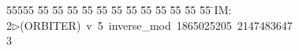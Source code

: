 %
%
\begin{tabbing}
55555 \= 55 \= 55 \= 55 \= 55 \= 55 \= 55 \= 55 \= 55 \= 55 \= 55 \= 55 \= 55 \= \>IM:\\[0pt]
2\>$\triangleright$\>(ORBITER)\ v\ 5\ inverse\_mod\ 1865025205\ 2147483647\\[0pt]
3\>\end{tabbing}
